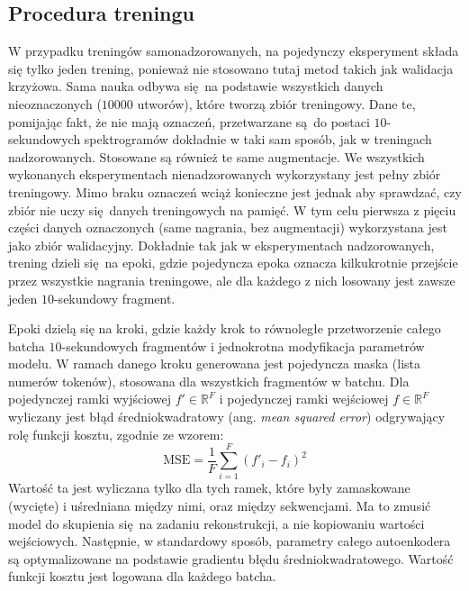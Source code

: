 \subsection{Procedura treningu}

W przypadku treningów samonadzorowanych, na pojedynczy eksperyment składa się tylko jeden trening, ponieważ nie stosowano tutaj metod takich jak walidacja krzyżowa. Sama nauka odbywa się na podstawie wszystkich danych nieoznaczonych ($10000$ utworów), które tworzą zbiór treningowy. Dane te, pomijając fakt, że nie mają oznaczeń, przetwarzane są do postaci $10$-sekundowych spektrogramów dokładnie w taki sam sposób, jak w treningach nadzorowanych. Stosowane są również te same augmentacje. We wszystkich wykonanych eksperymentach nienadzorowanych wykorzystany jest pełny zbiór treningowy. Mimo braku oznaczeń wciąż konieczne jest jednak aby sprawdzać, czy zbiór nie uczy się danych treningowych na pamięć. W tym celu pierwsza z pięciu części danych oznaczonych (same nagrania, bez augmentacji) wykorzystana jest jako zbiór walidacyjny. Dokładnie tak jak w eksperymentach nadzorowanych, trening dzieli się na epoki, gdzie pojedyncza epoka oznacza kilkukrotnie przejście przez wszystkie nagrania treningowe, ale dla każdego z nich losowany jest zawsze jeden $10$-sekundowy fragment.

Epoki dzielą się na kroki, gdzie każdy krok to równoległe przetworzenie całego batcha $10$-sekundowych fragmentów i jednokrotna modyfikacja parametrów modelu. W ramach danego kroku generowana jest pojedyncza maska (lista numerów tokenów), stosowana dla wszystkich fragmentów w batchu. Dla pojedynczej ramki wyjściowej $f' \in \mathbb{R}^F$ i pojedynczej ramki wejściowej $f \in \mathbb{R}^F$ wyliczany jest błąd średniokwadratowy (ang. \emph{mean squared error}) odgrywający rolę funkcji kosztu, zgodnie ze wzorem:
\begin{equation}
    \textrm{MSE} = \frac{1}{F} \sum_{i=1}^{F} (f'_{i} - f_{i})^2
\end{equation}
Wartość ta jest wyliczana tylko dla tych ramek, które były zamaskowane (wycięte) i uśredniana między nimi, oraz między sekwencjami. Ma to zmusić model do skupienia się na zadaniu rekonstrukcji, a nie kopiowaniu wartości wejściowych.  Następnie, w standardowy sposób, parametry całego autoenkodera są optymalizowane na podstawie gradientu błędu średniokwadratowego.  Wartość funkcji kosztu jest logowana dla każdego batcha.

